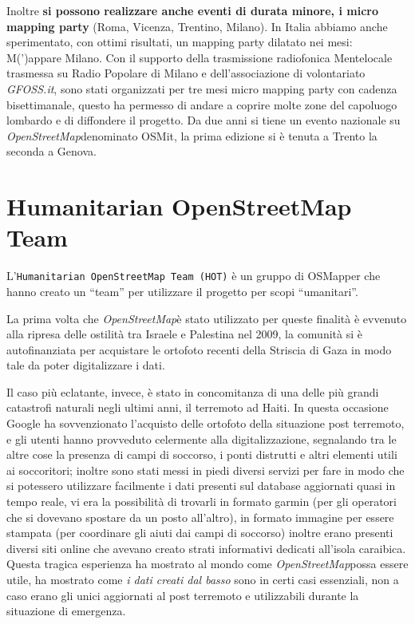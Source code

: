 \documentclass[a4paper,twoside,12pt,]{article}
\newcommand{\osm}{\emph{OpenStreetMap\xspace}}
\begin{document}
Inoltre \textbf{si possono realizzare anche eventi di durata minore, i micro mapping party} (Roma, Vicenza, Trentino, Milano). In Italia abbiamo anche sperimentato, con ottimi risultati, un mapping party dilatato nei mesi: M(')appare Milano. Con il supporto della trasmissione radiofonica Mentelocale trasmessa su Radio Popolare di Milano e dell'associazione di volontariato \emph{GFOSS.it}, sono stati organizzati per tre mesi micro mapping party con cadenza bisettimanale, questo ha permesso di andare a coprire molte zone del capoluogo lombardo e di diffondere il progetto. Da due anni si tiene un evento nazionale su \osm denominato OSMit, la prima edizione si è tenuta a Trento la seconda a Genova.
\section{Humanitarian OpenStreetMap Team}
L'\texttt{Humanitarian OpenStreetMap Team (HOT)} è un gruppo di OSMapper che hanno creato un ``team'' per utilizzare il progetto per scopi ``umanitari''.

La prima volta che \osm è stato utilizzato per queste finalità è evvenuto alla ripresa delle ostilità tra Israele e Palestina nel 2009, la comunità si è autofinanziata per acquistare le ortofoto recenti della Striscia di Gaza in modo tale da poter digitalizzare i dati.

Il caso più eclatante, invece, è stato in concomitanza di una delle più grandi catastrofi naturali negli ultimi anni, il terremoto ad Haiti. In questa occasione Google ha sovvenzionato l'acquisto delle ortofoto della situazione post terremoto, e gli utenti hanno provveduto celermente alla digitalizzazione, segnalando tra le altre cose la presenza di campi di soccorso, i ponti distrutti e altri elementi utili ai soccoritori; inoltre sono stati messi in piedi diversi servizi per fare in modo che si potessero utilizzare facilmente i dati presenti sul database aggiornati quasi in tempo reale, vi era la possibilità di trovarli in formato garmin (per gli operatori che si dovevano spostare da un posto all'altro), in formato immagine per essere stampata (per coordinare gli aiuti dai campi di soccorso) inoltre erano presenti diversi siti online che avevano creato strati informativi dedicati all'isola caraibica. Questa tragica esperienza ha mostrato al mondo come \osm possa essere utile, ha mostrato come \textit{i dati creati dal basso} sono in certi casi essenziali, non a caso erano gli unici aggiornati al post terremoto e utilizzabili durante la situazione di emergenza.
\end{document}
